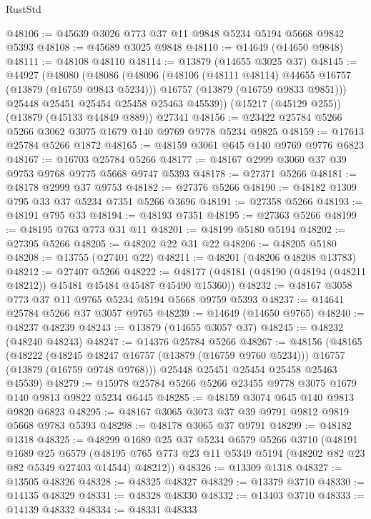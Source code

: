 \begin{lexlean}{RustStd}
\begin{coremodule}
@48106 := @45639 @3026 @773 @37 @11 @9848 @5234 @5194 @5668 @9842 @5393
@48108 := @45689 @3025 @9848
@48110 := @14649 (@14650 @9848)
@48111 := @48108 @48110
@48114 := @13879 (@14655 @3025 @37)
@48145 := @44927
    (@48080
      (@48086
        (@48096
          (@48106 (@48111 @48114) @44655 @16757 (@13879 (@16759 @9843 @5234)))
          @16757
          (@13879 (@16759 @9833 @9851)))
        @25448
        @25451
        @25454
        @25458
        @25463
        @45539))
    (@15217 (@45129 @255))
    (@13879 (@45133 @44849 @889))
    @27341
@48156 := @23422 @25784 @5266 @5266 @3062 @3075 @1679 @140 @9769 @9778 @5234 @9825
@48159 := @17613 @25784 @5266 @1872
@48165 := @48159 @3061 @645 @140 @9769 @9776 @6823
@48167 := @16703 @25784 @5266
@48177 := @48167 @2999 @3060 @37 @39 @9753 @9768 @9775 @5668 @9747 @5393
@48178 := @27371 @5266
@48181 := @48178 @2999 @37 @9753
@48182 := @27376 @5266
@48190 := @48182 @1309 @795 @33 @37 @5234 @7351 @5266 @3696
@48191 := @27358 @5266
@48193 := @48191 @795 @33
@48194 := @48193 @7351
@48195 := @27363 @5266
@48199 := @48195 @763 @773 @31 @11
@48201 := @48199 @5180 @5194
@48202 := @27395 @5266
@48205 := @48202 @22 @31 @22
@48206 := @48205 @5180
@48208 := @13755 (@27401 @22)
@48211 := @48201 (@48206 @48208 @13783)
@48212 := @27407 @5266
@48222 := @48177 (@48181 (@48190 (@48194 (@48211 @48212)) @45481 @45484 @45487 @45490 @15360))
@48232 := @48167 @3058 @773 @37 @11 @9765 @5234 @5194 @5668 @9759 @5393
@48237 := @14641 @25784 @5266 @37 @3057 @9765
@48239 := @14649 (@14650 @9765)
@48240 := @48237 @48239
@48243 := @13879 (@14655 @3057 @37)
@48245 := @48232 (@48240 @48243)
@48247 := @14376 @25784 @5266
@48267 := @48156
    (@48165
      (@48222
        (@48245 @48247 @16757 (@13879 (@16759 @9760 @5234)))
        @16757
        (@13879 (@16759 @9748 @9768)))
      @25448
      @25451
      @25454
      @25458
      @25463
      @45539)
@48279 := @15978 @25784 @5266 @5266 @23455 @9778 @3075 @1679 @140 @9813 @9822 @5234 @6445
@48285 := @48159 @3074 @645 @140 @9813 @9820 @6823
@48295 := @48167 @3065 @3073 @37 @39 @9791 @9812 @9819 @5668 @9783 @5393
@48298 := @48178 @3065 @37 @9791
@48299 := @48182 @1318
@48325 := @48299
    @1689
    @25
    @37
    @5234
    @6579
    @5266
    @3710
    (@48191
      @1689
      @25
      @6579
      (@48195 @765 @773 @23 @11 @5349 @5194 (@48202 @82 @23 @82 @5349 @27403 @14544) @48212))
@48326 := @13309 @1318
@48327 := @13505 @48326
@48328 := @48325 @48327
@48329 := @13379 @3710
@48330 := @14135 @48329
@48331 := @48328 @48330
@48332 := @13403 @3710
@48333 := @14139 @48332
@48334 := @48331 @48333

\end{coremodule}
\end{lexlean}
